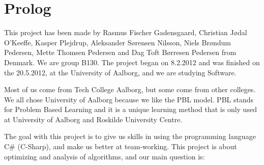 \chapter{Prolog}

This project has been made by Rasmus Fischer Gadensgaard, Christian Jødal O’Keeffe, Kasper Plejdrup, Aleksander Sørensen Nilsson, Niels Brøndum Pedersen, Mette Thomsen
Pedersen and Dag Toft Børresen Pedersen from Denmark. We are group B130. The project began on 8.2.2012 and was finished on the 20.5.2012, at the University of
Aalborg, and we are studying Software.

Most of us come from Tech College Aalborg, but some come from other colleges. We all chose University of Aalborg because we like the PBL model. PBL stands for Problem
Based Learning and it is a unique learning method that is only used at University of Aalborg and Roskilde University Centre.

The goal with this project is to give us skills in using the programming language C# (C-Sharp), and make us better at team-working. This project is about optimizing and analysis of algorithms, and our main question is: 
